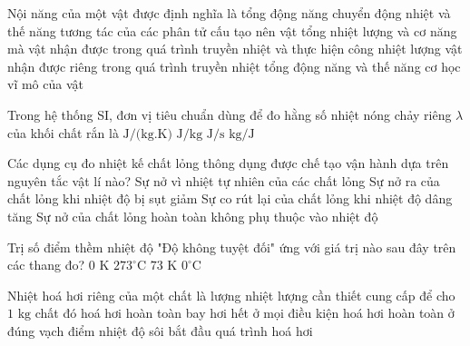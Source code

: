 \begin{ex}%
	Nội năng của một vật được định nghĩa là
	\choice
	{\True tổng động năng chuyển động nhiệt và thế năng tương tác của các phân tử cấu tạo nên vật}
	{tổng nhiệt lượng và cơ năng mà vật nhận được trong quá trình truyền nhiệt và thực hiện công}
	{nhiệt lượng vật nhận được riêng trong quá trình truyền nhiệt}
	{tổng động năng và thế năng cơ học vĩ mô của vật}
\end{ex}

\begin{ex}%
	Trong hệ thống SI, đơn vị tiêu chuẩn dùng để đo hằng số nhiệt nóng chảy riêng $\lambda$ của khối chất rắn là
	\choice
	{$\text{J/(kg.K)}$}
	{\True $\text{J/kg}$}
	{$\text{J/s}$}
	{$\text{kg/J}$}
\end{ex}

\begin{ex}%
	Các dụng cụ đo nhiệt kế chất lỏng thông dụng được chế tạo vận hành dựa trên nguyên tắc vật lí nào?
	\choice
	{\True Sự nở vì nhiệt tự nhiên của các chất lỏng}
	{Sự nở ra của chất lỏng khi nhiệt độ bị sụt giảm}
	{Sự co rút lại của chất lỏng khi nhiệt độ dâng tăng}
	{Sự nở của chất lỏng hoàn toàn không phụ thuộc vào nhiệt độ}
\end{ex}

\begin{ex}%
	Trị số điểm thềm nhiệt độ "Độ không tuyệt đối" ứng với giá trị nào sau đây trên các thang đo?
	\choice
	{\True $0\text{ K}$}
	{$273^\circ\text{C}$}
	{$73\text{ K}$}
	{$0^\circ\text{C}$}
\end{ex}

\begin{ex}%
	Nhiệt hoá hơi riêng của một chất là lượng nhiệt lượng cần thiết cung cấp để cho $1\text{ kg}$ chất đó
	\choice
	{hoá hơi hoàn toàn}
	{bay hơi hết ở mọi điều kiện}
	{\True hoá hơi hoàn toàn ở đúng vạch điểm nhiệt độ sôi}
	{bắt đầu quá trình hoá hơi}
\end{ex}

